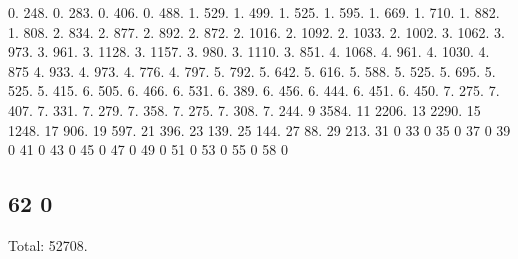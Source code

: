 0. 248. 0. 283. 0. 406. 0. 488. 1. 529. 1. 499. 1. 525. 1. 595. 1. 669. 1. 710. 1. 882. 1. 808. 2. 834. 2. 877. 2. 892. 2. 872. 2. 1016. 2. 1092. 2. 1033. 2. 1002. 3. 1062. 3. 973. 3. 961. 3. 1128. 3. 1157. 3. 980. 3. 1110. 3. 851. 4. 1068. 4. 961. 4. 1030. 4. 875 4. 933. 4. 973. 4. 776. 4. 797. 5. 792. 5. 642. 5. 616. 5. 588. 5. 525. 5. 695. 5. 525. 5. 415. 6. 505. 6. 466. 6. 531. 6. 389. 6. 456. 6. 444. 6. 451. 6. 450. 7. 275. 7. 407. 7. 331. 7. 279. 7. 358. 7. 275. 7. 308. 7. 244. 9 3584. 11 2206. 13 2290. 15 1248. 17 906. 19 597. 21 396. 23 139. 25 144. 27 88. 29 213. 31 0 33 0 35 0 37 0 39 0 41 0 43 0 45 0 47 0 49 0 51 0 53 0 55 0 58 0 \subsection*{62 0 }

Total\+: 52708. 